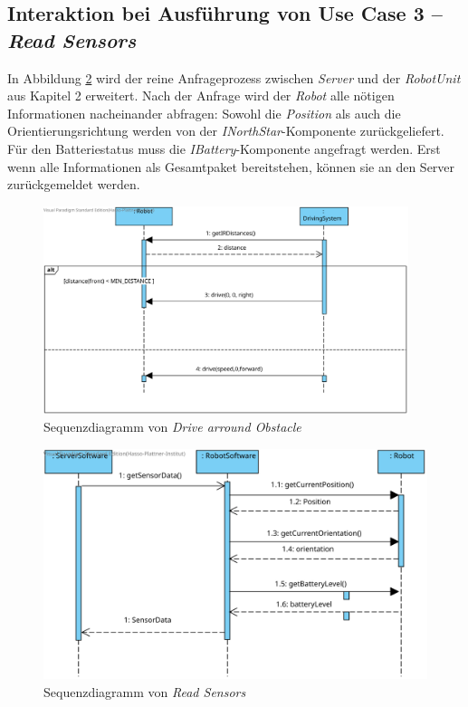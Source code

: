 	\subsection*{Interaktion bei Ausführung von Use Case 3 – \emph{Read Sensors}}
In Abbildung \ref{ReadSensors} wird der reine Anfrageprozess zwischen \emph{Server} und der \emph{RobotUnit} aus Kapitel 2 erweitert. Nach der Anfrage wird der \emph{Robot} alle nötigen Informationen nacheinander abfragen: Sowohl die \emph{Position} als auch die Orientierungsrichtung werden von der \emph{INorthStar}-Komponente zurückgeliefert. Für den Batteriestatus muss die \emph{IBattery}-Komponente angefragt werden. Erst wenn alle Informationen als Gesamtpaket bereitstehen, können sie an den Server zurückgemeldet werden.
\\
	\begin{figure}[H]
		\centering
		\includegraphics[width=0.95\textwidth]{img/1-Entwurf-8-DriveArroundObstacle}
		\caption{Sequenzdiagramm von \emph{Drive arround Obstacle}}
		\label{UmfahrenvonstatichenObjekten}
	\end{figure}
	\vspace{1cm}
	
	\begin{figure}[H]
		\centering
		\includegraphics[width=1\textwidth]{img/0-Entwurf-8-ReadSens}
		\caption{Sequenzdiagramm von \emph{Read Sensors}}
		\label{ReadSensors}
	\end{figure}
	
